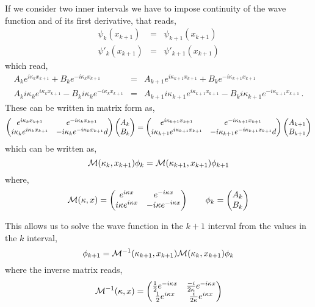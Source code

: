 \documentclass[singlecolumn]{revtex4}
\def\beq{\begin{equation}}{\it}
\def\eeq{\end{equation}}
\def\beqa{\begin{eqnarray}}{\it}
\def\eeqa{\end{eqnarray}}
\begin{document}
If we consider two inner intervals we have to impose continuity of the wave function 
and of its first derivative, that reads, 
\beqa
\psi_k(x_{k+1})&=&\psi_{k+1}(x_{k+1}) \nonumber\\
\psi'_k(x_{k+1})&=&\psi'_{k+1}(x_{k+1}) 
\eeqa
which read,
\beqa
A_k e^{i\kappa_k x_{k+1}} + B_k e^{-i\kappa_k x_{k+1}} &=&  A_{k+1} e^{i\kappa_{k+1} x_{k+1}} + B_k e^{-i\kappa_{k+1}x_{k+1}} 
\nonumber\\
  A_k i\kappa_k e^{i\kappa_k x_{k+1}} - B_k i \kappa_k e^{-i\kappa_k x_{k+1}} &=&  
A_{k+1} i \kappa_{k+1} e^{i\kappa_{k+1} x_{k+1}} - B_k i \kappa_{k+1} e^{-i\kappa_{k+1}x_{k+1}} \,.
\eeqa
These can be written in matrix form as,
\beq
\left(
\begin{matrix}
e^{i\kappa_k x_{k+1}} & e^{-i\kappa_k x_{k+1}} \cr
i\kappa_k e^{i\kappa_k x_{k+1}}  & -i \kappa_k e^{-i\kappa_k x_{k+1}} d\cr
\end{matrix}
\right)
\left(
\begin{matrix}
A_k\cr
B_k
\end{matrix}
\right)
=
\left(
\begin{matrix}
e^{i\kappa_{k+1} x_{k+1}} & e^{-i\kappa_{k+1} x_{k+1}} \cr
i\kappa_{k+1} e^{i\kappa_{k+1} x_{k+1}}  & -i \kappa_{k+1} e^{-i\kappa_{k+1} x_{k+1}} d\cr
\end{matrix}
\right)
\left(
\begin{matrix}
A_{k+1}\cr
B_{k+1}
\end{matrix}
\right)
\eeq
which can be written as,
\beq
{\cal M}(\kappa_k,x_{k+1}) \phi_k = {\cal M}(\kappa_{k+1},x_{k+1}) \phi_{k+1}
\eeq
where,
\beq
{\cal M}(\kappa,x) = \left(
\begin{matrix}
e^{i\kappa x} & e^{-i\kappa x} \cr
i\kappa e^{i\kappa x}  & -i \kappa e^{-i\kappa x} \cr
\end{matrix}
\right)
\qquad 
\phi_k=\left(
\begin{matrix}
A_{k}\cr
B_{k}
\end{matrix}
\right)
\eeq

This allows us to solve the wave function in the $k+1$ interval from the values in the 
$k$ interval,
\beq
\phi_{k+1} = 
{\cal M}^{-1}(\kappa_{k+1},x_{k+1}) 
{\cal M}(\kappa_{k},x_{k+1})
\phi_k
\eeq 
where the inverse matrix reads, 
\beq
{\cal M}^{-1}(\kappa,x) = \left(
\begin{matrix}
{1\over 2} e^{-i\kappa x} &{-i\over 2\kappa}  e^{-i\kappa x} \cr
{1\over 2} e^{i\kappa x}  & {i\over 2 \kappa} e^{i\kappa x} \cr
\end{matrix}
\right)
\eeq
\end{document}
